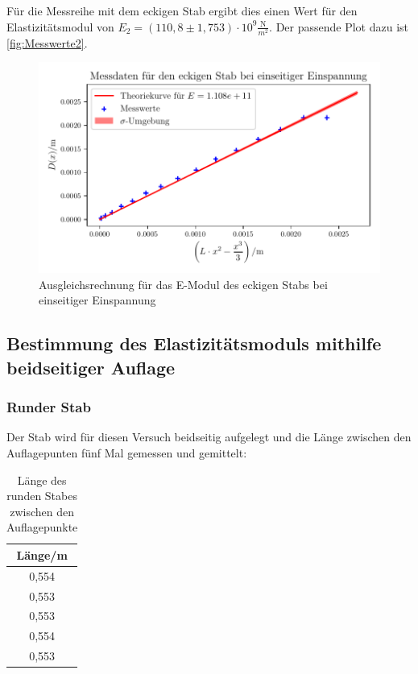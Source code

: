   Für die Messreihe mit dem eckigen Stab ergibt dies einen Wert für den Elastizitätsmodul von $E_2 = (110{,}8 \pm 1{,}753) \cdot \mathrm{10^{9}} \frac{\mathrm{N}}{m^2}$. Der passende Plot dazu ist
  \autoref{fig:Messwerte2}.

  \begin{figure}
    \centering
    \includegraphics{build/plot3.pdf}
    \caption{Ausgleichsrechnung für das E-Modul des eckigen Stabs bei einseitiger Einspannung}
    \label{fig:Messwerte2}
  \end{figure}
  \newpage

\subsection{Bestimmung des Elastizitätsmoduls mithilfe beidseitiger Auflage}

\subsubsection{Runder Stab}
  Der Stab wird für diesen Versuch beidseitig aufgelegt und die Länge zwischen den Auflagepunten fünf Mal gemessen und gemittelt:

  \begin{table}
    \centering
    \caption{Länge des runden Stabes zwischen den Auflagepunkte}
    \label{tab:beidseitig_runder_Laenge}
    \begin{tabular}{c}
      \toprule
      Länge/m \\
      \midrule
      0,554 \\
      0,553 \\
      0,553 \\
      0,554 \\
      0,553 \\
      \bottomrule
    \end{tabular}
  \end{table}

